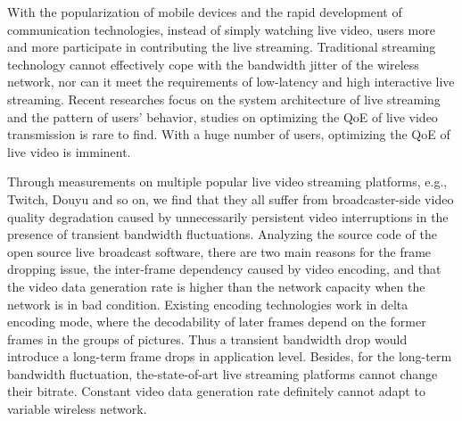 \begin{eabstract}
With the popularization of mobile devices and the rapid development of communication technologies, instead of simply watching live video, users more and more participate in contributing the live streaming. Traditional streaming technology cannot effectively cope with the bandwidth jitter of the wireless network, nor can it meet the requirements of low-latency and high interactive live streaming. %
Recent researches focus on the system architecture of live streaming and the pattern of users' behavior, studies on optimizing the QoE of live video transmission is rare to find. %
With a huge number of users, optimizing the QoE of live video is imminent.

Through measurements on
multiple popular live video streaming platforms, e.g., Twitch, Douyu and so on, we find that
they all suffer from broadcaster-side video quality degradation
caused by unnecessarily persistent video interruptions
in the presence of transient bandwidth fluctuations. Analyzing the source code of the open source live broadcast software, there are two main reasons for the frame dropping issue, the inter-frame dependency caused by video encoding, and that the video data generation rate is higher than the network capacity when the network is in bad condition. Existing encoding technologies work in delta encoding mode, where the decodability of later frames depend on the former frames in the groups of pictures. Thus a transient bandwidth drop would introduce a long-term frame drops in application level. Besides, for the long-term bandwidth fluctuation, the-state-of-art live streaming platforms cannot change their bitrate. Constant video data generation rate definitely cannot adapt to variable wireless network.


\end{eabstract}
